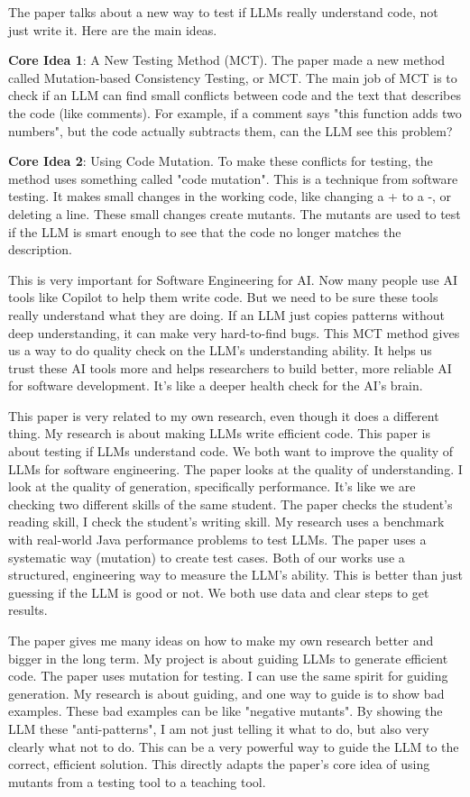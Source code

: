 \documentclass[11pt]{article}
\begin{document}
The paper talks about a new way to test if LLMs really understand code, not just write it. Here are the main ideas.

\textbf{Core Idea 1}: A New Testing Method (MCT). The paper made a new method called Mutation-based Consistency Testing, or MCT. The main job of MCT is to check if an LLM can find small conflicts between code and the text that describes the code (like comments). For example, if a comment says "this function adds two numbers", but the code actually subtracts them, can the LLM see this problem?

\textbf{Core Idea 2}: Using Code Mutation. To make these conflicts for testing, the method uses something called "code mutation". This is a technique from software testing. It makes small changes in the working code, like changing a + to a -, or deleting a line. These small changes create mutants. The mutants are used to test if the LLM is smart enough to see that the code no longer matches the description.

This is very important for Software Engineering for AI. Now many people use AI tools like Copilot to help them write code. But we need to be sure these tools really understand what they are doing. If an LLM just copies patterns without deep understanding, it can make very hard-to-find bugs. This MCT method gives us a way to do quality check on the LLM's understanding ability. It helps us trust these AI tools more and helps researchers to build better, more reliable AI for software development. It's like a deeper health check for the AI's brain.

This paper is very related to my own research, even though it does a different thing. My research is about making LLMs write efficient code. This paper is about testing if LLMs understand code. We both want to improve the quality of LLMs for software engineering. The paper looks at the quality of understanding. I look at the quality of generation, specifically performance. It's like we are checking two different skills of the same student. The paper checks the student's reading skill, I check the student's writing skill. My research uses a benchmark with real-world Java performance problems to test LLMs. The paper uses a systematic way (mutation) to create test cases. Both of our works use a structured, engineering way to measure the LLM's ability. This is better than just guessing if the LLM is good or not. We both use data and clear steps to get results.

The paper gives me many ideas on how to make my own research better and bigger in the long term. My project is about guiding LLMs to generate efficient code. 
The paper uses mutation for testing. I can use the same spirit for guiding generation. My research is about guiding, and one way to guide is to show bad examples. These bad examples can be like "negative mutants". By showing the LLM these "anti-patterns", I am not just telling it what to do, but also very clearly what not to do. This can be a very powerful way to guide the LLM to the correct, efficient solution. This directly adapts the paper's core idea of using mutants from a testing tool to a teaching tool.
\end{document}
